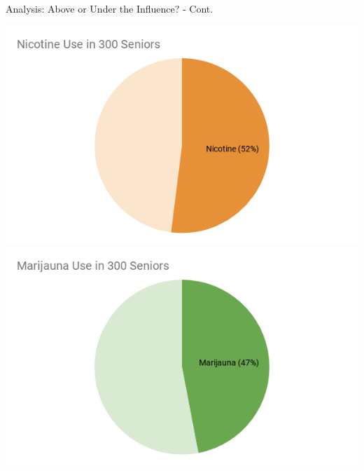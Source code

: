 \documentclass{beamer}
\begin{document}
\begin{frame}{Analysis: Above or Under the Influence? - Cont.}
        \begin{center}
        \includegraphics[scale=.25]{images/aboveunder-nicotine.png}
        \includegraphics[scale=.25]{images/aboveunder-marijauna.png}
        

\end{center}
\end{frame}
\end{document}
